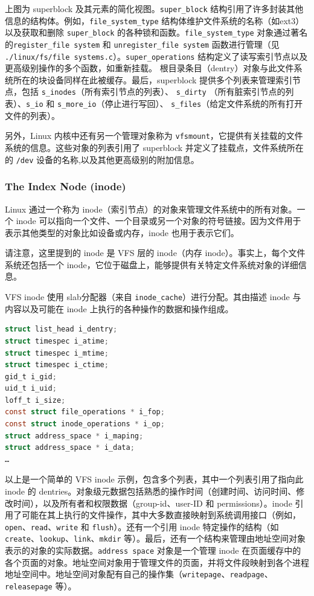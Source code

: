 \documentclass[UTF8,a4paper]{ctexart}
\begin{document}
上图为 superblock 及其元素的简化视图。\texttt{super\_block}
结构引用了许多封装其他信息的结构体。例如，\texttt{file\_system\_type}
结构体维护文件系统的名称（如ext3）以及获取和删除 \texttt{super\_block}
的各种锁和函数。\texttt{file\_system\_type}
对象通过著名的\texttt{register\_file\ system} 和
\texttt{unregister\_file\ system} 函数进行管理（见
\texttt{./linux/fs/file\ systems.c}）。\texttt{super\_operations}
结构定义了读写索引节点以及更高级别操作的多个函数，如重新挂载。
根目录条目（dentry）对象与此文件系统所在的块设备同样在此被缓存。最后，superblock
提供多个列表来管理索引节点，包括
\texttt{s\_inodes}（所有索引节点的列表）、
\texttt{s\_dirty}
（所有脏索引节点的列表）、\texttt{s\_io}
和
\texttt{s\_more\_io}（停止进行写回）、
\texttt{s\_files}（给定文件系统的所有打开文件的列表）。

另外，Linux 内核中还有另一个管理对象称为
\texttt{vfsmount}，它提供有关挂载的文件系统的信息。这些对象的列表引用了
superblock 并定义了挂载点，文件系统所在的 \texttt{/dev}
设备的名称,以及其他更高级别的附加信息。


\subsubsection{The Index Node (inode)}
Linux 通过一个称为
inode（索引节点）的对象来管理文件系统中的所有对象。一个 inode
可以指向一个文件、一个目录或另一个对象的符号链接。因为文件用于表示其他类型的对象比如设备或内存，inode
也用于表示它们。

请注意，这里提到的 inode 是 VFS 层的 inode（内存
inode）。事实上，每个文件系统还包括一个
inode，它位于磁盘上，能够提供有关特定文件系统对象的详细信息。

VFS inode 使用
slab分配器（来自 \texttt{inode\_cache}）进行分配。其由描述 inode
与内容以及可能在 inode 上执行的各种操作的数据和操作组成。

\begin{lstlisting}[language=C]
struct list_head i_dentry;
struct timespec i_atime;
struct timespec i_mtime;
struct timespec i_ctime;
gid_t i_gid;
uid_t i_uid;
loff_t i_size;
const struct file_operations * i_fop;
const struct inode_operations * i_op;
struct address_space * i_maping;
struct address_space * i_data;
…
\end{lstlisting}

以上是一个简单的 VFS inode 示例，包含多个列表，其中一个列表引用了指向此
inode 的
dentries。对象级元数据包括熟悉的操作时间（创建时间、访问时间、修改时间），以及所有者和权限数据（group-id、user-ID
和 permissions）。inode
引用了可能在其上执行的文件操作，其中大多数直接映射到系统调用接口（例如，\texttt{open}、\texttt{read}、\texttt{write}
和 \texttt{flush}）。还有一个引用 inode 特定操作的结构（如
\texttt{create}、\texttt{lookup}、\texttt{link}、\texttt{mkdir}
等）。最后，还有一个结构来管理由地址空间对象表示的对象的实际数据。\texttt{address\ space}
对象是一个管理 inode
在页面缓存中的各个页面的对象。地址空间对象用于管理文件的页面，并将文件段映射到各个进程地址空间中。地址空间对象配有自己的操作集（\texttt{writepage}、\texttt{readpage}、\texttt{releasepage}
等）。
\end{document}
